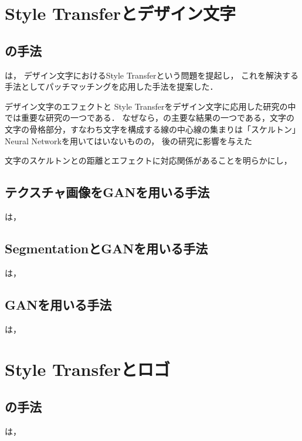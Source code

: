 \documentclass[\homedir/main.tex]{subfiles}
\begin{document}
\section{Style Transferとデザイン文字}\label{sec:text_effects_transfer}
\subsection{の手法}
\citeauthor{Yang_2017_CVPR}\cite{Yang_2017_CVPR}は，
デザイン文字におけるStyle Transferという問題を提起し，
これを解決する手法としてパッチマッチングを応用した手法を提案した．

デザイン文字のエフェクトと
Style Transferをデザイン文字に応用した研究の中では重要な研究の一つである．
なぜなら，\cite{Yang_2017_CVPR}の主要な結果の一つである，文字の
文字の骨格部分，すなわち文字を構成する線の中心線の集まりは「スケルトン」
Neural Networkを用いてはいないものの，
後の研究に影響を与えた

文字のスケルトンとの距離とエフェクトに対応関係があることを明らかにし，


\subsection{テクスチャ画像をGANを用いる手法}
\citeauthor{Yang2019Controllable}\cite{Yang2019Controllable}は，

\subsection{SegmentationとGANを用いる手法}
\citeauthor{typography2019}\cite{typography2019}は，

\subsection{GANを用いる手法}
\citeauthor{Yang2019TETGAN}\cite{Yang2019TETGAN}は，

\section{Style Transferとロゴ}\label{sec:logo_style_transfer}
\subsection{の手法}
\citeauthor{icpram20}\cite{icpram20}は，
\end{document}

